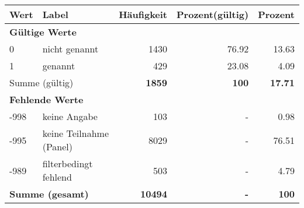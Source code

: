     \begin{longtable}{lXrrr}
     \toprule
     \textbf{Wert} & \textbf{Label} & \textbf{Häufigkeit} & \textbf{Prozent(gültig)} & \textbf{Prozent} \\
     \endhead
     \midrule
     \multicolumn{5}{l}{\textbf{Gültige Werte}}\\

     0 &
     \multicolumn{1}{X}{ nicht genannt   } &


       \num{1430} &
       \num[round-mode=places,round-precision=2]{76.92} &
         \num[round-mode=places,round-precision=2]{13.63} \\

     1 &
     \multicolumn{1}{X}{ genannt   } &


       \num{429} &
       \num[round-mode=places,round-precision=2]{23.08} &
         \num[round-mode=places,round-precision=2]{4.09} \\
     \midrule
     \multicolumn{2}{l}{Summe (gültig)} &
       \textbf{\num{1859}} &
     \textbf{\num{100}} &
       \textbf{\num[round-mode=places,round-precision=2]{17.71}} \\
     \multicolumn{5}{l}{\textbf{Fehlende Werte}}\\
       -998 &
       keine Angabe &
         \num{103} &
        - &
         \num[round-mode=places,round-precision=2]{0.98} \\
       -995 &
       keine Teilnahme (Panel) &
         \num{8029} &
        - &
         \num[round-mode=places,round-precision=2]{76.51} \\
       -989 &
       filterbedingt fehlend &
         \num{503} &
        - &
         \num[round-mode=places,round-precision=2]{4.79} \\
     \midrule
     \multicolumn{2}{l}{\textbf{Summe (gesamt)}} &
          \textbf{\num{10494}} &
        \textbf{-} &
        \textbf{\num{100}} \\
     \bottomrule
     \end{longtable}
     

